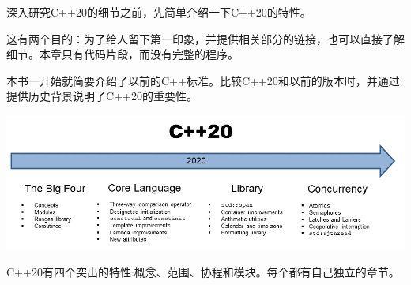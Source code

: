 

深入研究C++20的细节之前，先简单介绍一下C++20的特性。

这有两个目的：为了给人留下第一印象，并提供相关部分的链接，也可以直接了解细节。本章只有代码片段，而没有完整的程序。

本书一开始就简要介绍了以前的C++标准。比较C++20和以前的版本时，并通过提供历史背景说明了C++20的重要性。

\begin{center}
\includegraphics[width=1.0\textwidth]{content/2/chapter3/images/1.png}\\
\end{center}

C++20有四个突出的特性:概念、范围、协程和模块。每个都有自己独立的章节。








